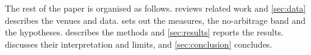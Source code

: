 The rest of the paper is organised as follows.  reviews related work and
\cref{sec:data} describes the venues and data.  sets out the measures, the
no-arbitrage band and the hypotheses.  describes the methods and \cref{sec:results}
reports the results.  discusses their interpretation and limits, and
\cref{sec:conclusion} concludes.
